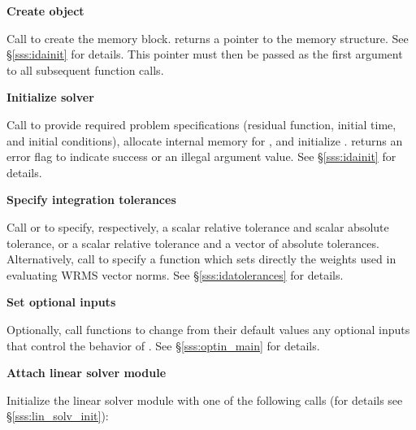 \begin{Steps}
\item\label{i:ida_create} 
  {\bf Create {\ida} object}

  Call \id{()} 
  to create the {\ida} memory block.
   returns a pointer to the {\ida} memory structure.
  See \S\ref{sss:idainit} for details.
  This  pointer must then be passed as the first argument
  to all subsequent {\ida} function calls.

\item\label{i:ida_init} 
  {\bf Initialize {\ida} solver}

  Call  to provide required problem
  specifications (residual function, initial time, and initial conditions),
  allocate internal memory for {\ida}, and initialize {\ida}.
   returns an error flag to indicate success or an illegal argument
  value.  See \S\ref{sss:idainit} for details.
  
\item
  {\bf Specify integration tolerances}

  Call  or 
  to specify, respectively, a scalar relative tolerance and scalar
  absolute tolerance, or a scalar relative tolerance and a vector of
  absolute tolerances.  Alternatively, call  to
  specify a function which sets directly the weights used in
  evaluating WRMS vector norms.  See \S\ref{sss:idatolerances} for
  details.

\item
  {\bf Set optional inputs}

  Optionally, call  functions to change from their default values any
  optional inputs that control the behavior of {\ida}.
  See \S\ref{sss:optin_main} for details.

\item\label{i:lin_solver} 
  {\bf Attach linear solver module}

  Initialize the linear solver module
  with one of the following calls (for details see \S\ref{sss:lin_solv_init}):

  {\s} 

  {\s} 

  {\s} 

  {\s} 



\end{Steps}
